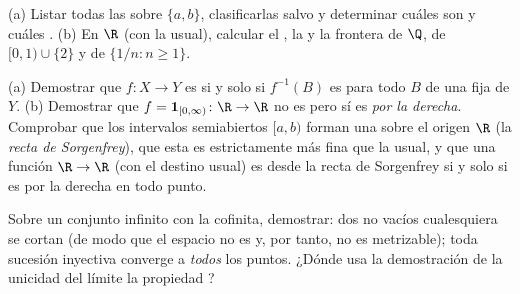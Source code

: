 \begin{exercise}[$\star$]\label{exo:b3:topology:1}
(a) Listar todas las  sobre $\{a, b\}$, clasificarlas salvo
 y determinar cuáles
son  y cuáles
. (b) En $\R$ (con la
 usual), calcular el
, la
 y la frontera de $\Q$, de
$[0,1) \cup \{2\}$ y de $\{1/n : n \geq
1\}$.
\end{exercise}

\begin{exercise}[$\star$]\label{exo:b3:topology:2}
(a) Demostrar que $f\colon X \to Y$ es
 si y solo si $f^{-1}(B)$
es  para todo $B$ de una 
fija de $Y$. (b) Demostrar que
$f = \mathbf 1_{[0,\infty)} \colon \R \to \R$ no es
 pero sí es
\emph{ por la derecha}.
Comprobar que los intervalos semiabiertos $[a, b)$ forman una
 sobre el origen
$\R$ (la \emph{recta de Sorgenfrey}), que esta
 es estrictamente más fina
que la usual, y que una función $\R \to
\R$ (con el destino usual) es
 desde la recta de
Sorgenfrey si y solo si es 
por la derecha en todo punto.
\end{exercise}

\begin{exercise}[$\star$]\label{exo:b3:topology:3}
Sobre un conjunto infinito con la
 cofinita, demostrar: dos
 no vacíos cualesquiera se
cortan (de modo que el espacio no es
 y, por tanto, no es
metrizable); toda sucesión inyectiva converge a \emph{todos} los puntos.
¿Dónde usa la demostración de la unicidad del límite la propiedad
?
\end{exercise}

